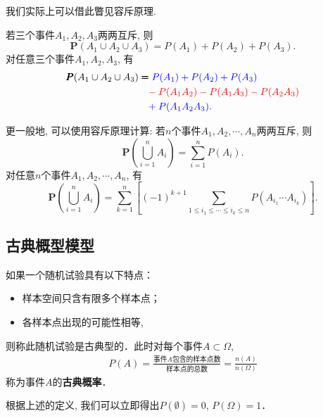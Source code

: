 \begin{asidebox}
    我们实际上可以借此瞥见容斥原理.
    \begin{remark}
        若三个事件$A_1, A_2, A_3$两两互斥, 则
        $$\pmb P(A_1 \cup A_2 \cup A_3) = P(A_1)+P(A_2)+P(A_3).$$
        对任意三个事件$A_1, A_2, A_3$, 有
        \begin{align*}
            \pmb P(A_1 \cup A_2 \cup A_3) & \pmb=\color{blue}P(A_1)+P(A_2)+P(A_3)              \\
                                          & \phantom=\color{red}-P(A_1A_2)-P(A_1A_3)-P(A_2A_3) \\
                                          & \phantom=\color{blue}+P(A_1A_2A_3).
        \end{align*}%
    \end{remark}

    \begin{remark}
        更一般地, 可以使用容斥原理计算:
        若$n$个事件$A_1, A_2, \cdots, A_n$两两互斥, 则
        $$\pmb P\left( \bigcup_{i=1}^n A_i \right)=\sum_{i=1}^n P(A_i).$$
        \vspace{0.2in}
        对任意$n$个事件$A_1, A_2, \cdots, A_n$, 有
        $$\pmb P\left( \bigcup_{i=1}^n A_i \right)=\sum_{k=1}^n \left[ (-1)^{k+1} \sum_{1\le i_1\le \cdots\le i_k \le n} P(A_{i_1}\cdots A_{i_k}) \right].$$
    \end{remark}


\end{asidebox}

\subsection{古典概型模型}
\begin{definition}
    如果一个随机试验具有以下特点：
    \begin{itemize}%
        \item 样本空间只含有限多个样本点；
        \item 各样本点出现的可能性相等, 
    \end{itemize}
    则称此随机试验是古典型的．此时对每个事件$A\subset \Omega$, 
    \begin{align*}
        P(A)=\frac{\mbox{事件$A$包含的样本点数}}{\mbox{样本点的总数}}=\frac{n(A)}{n(\Omega)}
    \end{align*}
    称为事件$A$的\textbf{古典概率}．
\end{definition}

根据上述的定义, 我们可以立即得出$P(\emptyset)=0$, $P(\Omega)=1$．






